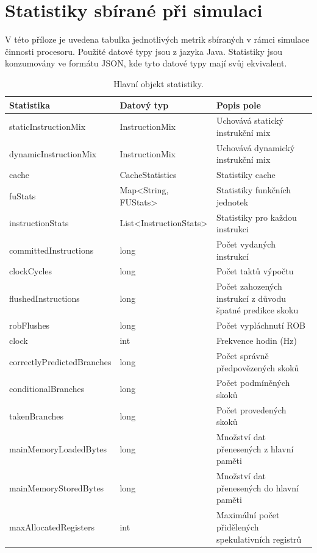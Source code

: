 \chapter{Statistiky sbírané při simulaci}
\label{statsAppend}

V této příloze je uvedena tabulka jednotlivých metrik sbíraných v rámci simulace činnosti procesoru.
Použité datové typy jsou z jazyka Java.
Statistiky jsou konzumovány ve formátu JSON, kde tyto datové typy mají svůj ekvivalent.

\begin{table}[!ht]
    \centering
    \begin{tabular}{|l|l|p{6cm}|}
    \hline
        Statistika & Datový typ & Popis pole \\ \hline\hline
        staticInstructionMix & InstructionMix & Uchovává statický instrukční mix \\ 
        dynamicInstructionMix & InstructionMix & Uchovává dynamický instrukční mix \\ 
        cache & CacheStatistics & Statistiky cache \\ 
        fuStats & Map<String, FUStats> & Statistiky funkčních jednotek \\ 
        instructionStats & List<InstructionStats> & Statistiky pro každou instrukci \\ 
        committedInstructions & long & Počet vydaných instrukcí \\ 
        clockCycles & long & Počet taktů výpočtu \\ 
        flushedInstructions & long & Počet zahozených instrukcí z důvodu špatné predikce skoku \\ 
        robFlushes & long & Počet vypláchnutí ROB \\ 
        clock & int & Frekvence hodin (Hz) \\ 
        correctlyPredictedBranches & long & Počet správně předpovězených skoků \\ 
        conditionalBranches & long & Počet podmíněných skoků \\ 
        takenBranches & long & Počet provedených skoků \\ 
        mainMemoryLoadedBytes & long & Množství dat přenesených z hlavní paměti \\ 
        mainMemoryStoredBytes & long & Množství dat přenesených do hlavní paměti \\ 
        maxAllocatedRegisters & int & Maximální počet přidělených spekulativních registrů \\ \hline
    \end{tabular}
    \caption{Hlavní objekt statistiky.}
    \label{mainstatsTable}
\end{table}

